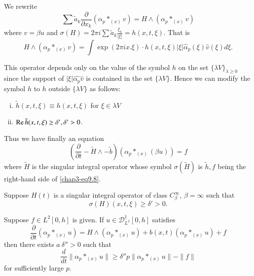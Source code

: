 We rewrite
 $$
 \sum \tilde{a}_k \frac{\partial}{\partial x_k} (\alpha_p *_{(x)}v) =
 H \wedge (\alpha_p *_{(x)}v) 
 $$
 where $v = \beta u$ and $\sigma (H)= 2 \pi i \sum \tilde{a}_k
 \frac{\xi_k}{|\xi|} =  h(x, t, \xi)$. That is  
 $$
 H \wedge (\alpha_p *_{(x)}v) = \int \exp (2 \pi ix. \xi) \cdot h (x, t,
 \xi)|  \xi | \hat{\alpha}_p  (\xi) \hat{v} (\xi) d \xi. 
 $$\pageoriginale

 This operator depends only on the value of the symbol $h$ on the set
 $\{ \lambda V\}_{\lambda \geq 0}$ since the support of $| \xi |
 \hat{\alpha_p} \hat{v}$ is contained in the set $\{ \lambda V
 \}$. Hence we can modify the symbol $h$ to $h$ outside $\{ 
 \lambda V\}$ as follows: 
\begin{enumerate}[(i)]
\item $\tilde{h} (x, t, \xi) \equiv h(x, t, \xi)$ for $\xi \in \lambda
  V$ 

\item $\operatorname{Re} \tilde{h} (x, t, \xi) \ge \delta', \delta' > 0 $. 
 \end{enumerate} 
 
 Thus we have finally an equation
 \begin{equation}
( \frac{\partial}{\partial t} - \tilde{H}\wedge - \tilde{b}) ( \alpha_p
   *_{(x)}(\beta u)) = f \tag{9.9} \label{chap3-eq9.9}
 \end{equation} 
 where $\tilde{H}$ is the singular integral operator whose symbol
 $\sigma (\tilde{H})$ is $\tilde{h}, f$ being the right-hand side of
 \eqref{chap3-eq9.8}. 
 
\setcounter{lemma}{0}
 \begin{lemma}\label{chap3-sec9-lem1}%
Suppose $H(t)$ is a singular integral operator of class
$C^\infty_\beta$, $\beta = \infty$ such that  
\begin{equation}
\sigma (H) (x, t, \xi) \ge \delta' > 0. \tag{9.10} \label{chap3-eq9.10}
\end{equation}

Suppose $f \in L^2 [0, h]$ is given. If $u \in \mathscr{D}^1_{L^2}[0, 
  h]$ satisfies 
 \begin{equation}
\frac{\partial}{\partial t} (\alpha_p *_{(x)} u) = H \wedge (\alpha_p
*_{(x)}u) + b(x, t)( \alpha_p *_{(x)}u) +  f
\tag{9.11} \label{chap3-eq9.11} 
 \end{equation} 
 then there exists $a\ \delta'' > 0$ such that 
 \begin{equation}
\frac{d}{dt} \| \alpha_p *_{(x)}u \|  \ge \delta'' p \| \alpha_p
*_{(x)} u \| - \| f \| \tag{9.12}\label{chap3-eq9.12} 
\end{equation} 
for sufficiently large $p$.
\end{lemma}

